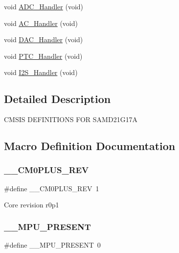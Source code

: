 \begin{DoxyCompactItemize}
void \mbox{\hyperlink{group___s_a_m_d21_g17_a__cmsis_gada953331e0adc056867e918bc80ce8a5}{A\+D\+C\+\_\+\+Handler}} (void)
\item 
void \mbox{\hyperlink{group___s_a_m_d21_g17_a__cmsis_ga591d634cc8d92aabdba828034e30ec92}{A\+C\+\_\+\+Handler}} (void)
\item 
void \mbox{\hyperlink{group___s_a_m_d21_g17_a__cmsis_ga8d4b8614e1c8468e26d48a962c57dc70}{D\+A\+C\+\_\+\+Handler}} (void)
\item 
void \mbox{\hyperlink{group___s_a_m_d21_g17_a__cmsis_ga1d86b5af01af9f6a15c23a6406dbc31b}{P\+T\+C\+\_\+\+Handler}} (void)
\item 
void \mbox{\hyperlink{group___s_a_m_d21_g17_a__cmsis_ga297c5fe9f2473775954df08f533541fb}{I2\+S\+\_\+\+Handler}} (void)
\end{DoxyCompactItemize}


\subsection{Detailed Description}
C\+M\+S\+IS D\+E\+F\+I\+N\+I\+T\+I\+O\+NS F\+OR S\+A\+M\+D21\+G17A 

\subsection{Macro Definition Documentation}
\mbox{\label{group___s_a_m_d21_g17_a__cmsis_ga2b7180ed347a0e902c5765deb46e650e}} 
\subsubsection{\texorpdfstring{\_\_CM0PLUS\_REV}{\_\_CM0PLUS\_REV}}
{\footnotesize\ttfamily \#define \+\_\+\+\_\+\+C\+M0\+P\+L\+U\+S\+\_\+\+R\+EV~1}

Core revision r0p1 \mbox{\label{group___s_a_m_d21_g17_a__cmsis_ga4127d1b31aaf336fab3d7329d117f448}} 
\subsubsection{\texorpdfstring{\_\_MPU\_PRESENT}{\_\_MPU\_PRESENT}}
{\footnotesize\ttfamily \#define \+\_\+\+\_\+\+M\+P\+U\+\_\+\+P\+R\+E\+S\+E\+NT~0}

